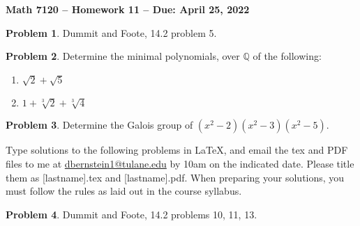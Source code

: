 \documentclass[letterpaper,11pt]{amsart}
\theoremstyle{plain}
\theoremstyle{definition}
\newtheorem{pr}{Problem}
\theoremstyle{remark}
\begin{document}
\Large

\begin{center}
{\bf Math 7120 -- Homework  11 --  Due:  April 25, 2022}
\end{center}

\normalsize

\medskip



\begin{pr}
    Dummit and Foote, 14.2 problem 5.
\end{pr}



\begin{pr}
    Determine the minimal polynomials, over $\mathbb{Q}$ of the following:
    \begin{enumerate}
        \item $\sqrt{2} + \sqrt{5}$
        \item $1 + \sqrt[3]{2} + \sqrt[3]{4}$
    \end{enumerate}
\end{pr}

\begin{pr}
    Determine the Galois group of $(x^2-2)(x^2-3)(x^2-5)$.
\end{pr}




\bigskip

Type solutions to the following problems in \LaTeX, and email the tex and PDF files to me at \url{dbernstein1@tulane.edu} by 10am on the indicated date.
Please title them as [lastname].tex and [lastname].pdf.
When preparing your solutions, you must follow the rules as laid out in the course syllabus.

\vspace{.5cm}


\begin{pr}
    Dummit and Foote, 14.2 problems 10, 11, 13.
\end{pr}
\end{document}
